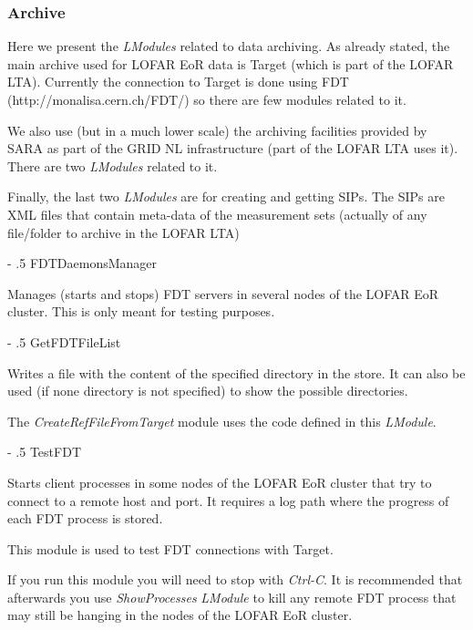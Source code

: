 \documentclass[a4paper,11pt]{article}
\makeatletter
\renewcommand\paragraph{%
   \@startsection{paragraph}{4}{0mm}%
      {-\baselineskip}%
      {.5\baselineskip}%
      {\normalfont\normalsize\bfseries}}
\makeatother
\begin{document}
\subsubsection{Archive}

Here we present the \textit{LModules} related to data archiving. As already stated, the main archive used for LOFAR EoR data is Target (which is part of the LOFAR LTA). Currently the connection to Target is done using FDT (http://monalisa.cern.ch/FDT/) so there are few modules related to it.

We also use (but in a much lower scale) the archiving facilities provided by SARA as part of the GRID NL infrastructure (part of the LOFAR LTA uses it). There are two \textit{LModules} related to it.

Finally, the last two \textit{LModules} are for creating and getting SIPs. The SIPs are XML files that contain meta-data of the measurement sets (actually of any file/folder to archive in the LOFAR LTA)

\paragraph{FDTDaemonsManager}

Manages (starts and stops) FDT servers in several nodes of the LOFAR EoR cluster. This is only meant for testing purposes.

\paragraph{GetFDTFileList}

Writes a file with the content of the specified directory in the store. It can also be used (if none directory is not specified) to show the possible directories.

The \textit{CreateRefFileFromTarget} module uses the code defined in this \textit{LModule}.
        
\paragraph{TestFDT}

Starts client processes in some nodes of the LOFAR EoR cluster that try to connect to a remote host and port. It requires a log path where the progress of each FDT process is stored.

This module is used to test FDT connections with Target.

If you run this module you will need to stop with \textit{Ctrl-C}. It is recommended that afterwards you use \textit{ShowProcesses} \textit{LModule} to kill any remote FDT process that may still be hanging in the nodes of the LOFAR EoR cluster.   
\end{document}
